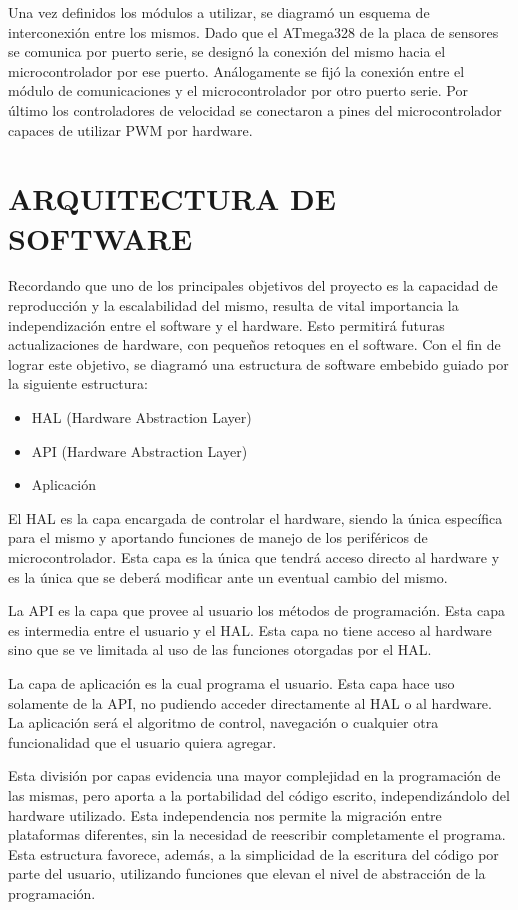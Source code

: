 \documentclass[conference]{IEEEtran}
\begin{document}
	Una vez definidos los módulos a utilizar, se diagramó un esquema de interconexión entre los mismos. Dado que el ATmega328 de la placa de sensores se comunica por puerto serie, se designó la conexión del mismo hacia el microcontrolador por ese puerto. Análogamente se fijó la conexión entre el módulo de comunicaciones y el microcontrolador por otro puerto serie. Por último los controladores de velocidad se conectaron a pines del microcontrolador capaces de utilizar PWM por hardware.

\section{ARQUITECTURA DE SOFTWARE}
Recordando que uno de los principales objetivos del proyecto es la capacidad de reproducción y la escalabilidad del mismo, resulta de vital importancia la independización entre el software y el hardware. Esto permitirá futuras actualizaciones de hardware, con pequeños retoques en el software. Con el fin de lograr este objetivo, se diagramó una estructura de software embebido guiado por la siguiente estructura:
\begin{itemize}
\item HAL (Hardware Abstraction Layer)
\item API  (Hardware Abstraction Layer)
\item Aplicación 
\end{itemize}

El HAL es la capa encargada de controlar el hardware, siendo la única específica para el mismo y aportando funciones de manejo de los periféricos de microcontrolador. Esta capa es la única que tendrá acceso directo al hardware y es la única que se deberá modificar ante un eventual cambio del mismo.

La API es la capa que provee al usuario los métodos de programación. Esta capa es intermedia entre el usuario y el HAL. Esta capa no tiene acceso al hardware sino que se ve limitada al uso de las funciones otorgadas por el HAL.

La capa de aplicación es la cual programa el usuario. Esta capa hace uso solamente de la API, no pudiendo acceder directamente al HAL o al hardware. La aplicación será el algoritmo de control, navegación o cualquier otra funcionalidad que el usuario quiera agregar.

Esta división por capas evidencia una mayor complejidad en la programación de las mismas, pero aporta a la portabilidad del código escrito, independizándolo del hardware utilizado. Esta independencia nos permite la migración entre plataformas diferentes, sin la necesidad de reescribir completamente el programa. Esta estructura favorece, además, a la simplicidad de la escritura del código por parte del usuario, utilizando funciones que elevan el nivel de abstracción de la programación.
\end{document}
